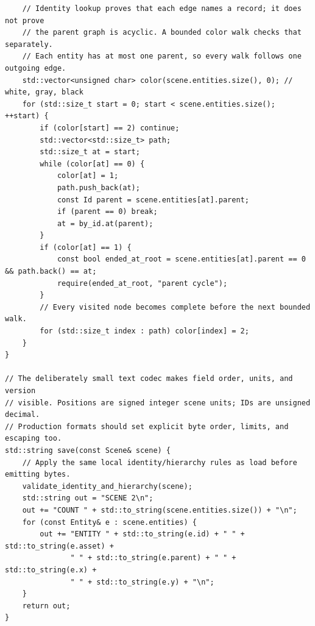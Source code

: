 \begin{verbatim}
    // Identity lookup proves that each edge names a record; it does not prove
    // the parent graph is acyclic. A bounded color walk checks that separately.
    // Each entity has at most one parent, so every walk follows one outgoing edge.
    std::vector<unsigned char> color(scene.entities.size(), 0); // white, gray, black
    for (std::size_t start = 0; start < scene.entities.size(); ++start) {
        if (color[start] == 2) continue;
        std::vector<std::size_t> path;
        std::size_t at = start;
        while (color[at] == 0) {
            color[at] = 1;
            path.push_back(at);
            const Id parent = scene.entities[at].parent;
            if (parent == 0) break;
            at = by_id.at(parent);
        }
        if (color[at] == 1) {
            const bool ended_at_root = scene.entities[at].parent == 0 && path.back() == at;
            require(ended_at_root, "parent cycle");
        }
        // Every visited node becomes complete before the next bounded walk.
        for (std::size_t index : path) color[index] = 2;
    }
}

// The deliberately small text codec makes field order, units, and version
// visible. Positions are signed integer scene units; IDs are unsigned decimal.
// Production formats should set explicit byte order, limits, and escaping too.
std::string save(const Scene& scene) {
    // Apply the same local identity/hierarchy rules as load before emitting bytes.
    validate_identity_and_hierarchy(scene);
    std::string out = "SCENE 2\n";
    out += "COUNT " + std::to_string(scene.entities.size()) + "\n";
    for (const Entity& e : scene.entities) {
        out += "ENTITY " + std::to_string(e.id) + " " + std::to_string(e.asset) +
               " " + std::to_string(e.parent) + " " + std::to_string(e.x) +
               " " + std::to_string(e.y) + "\n";
    }
    return out;
}


\end{verbatim}
